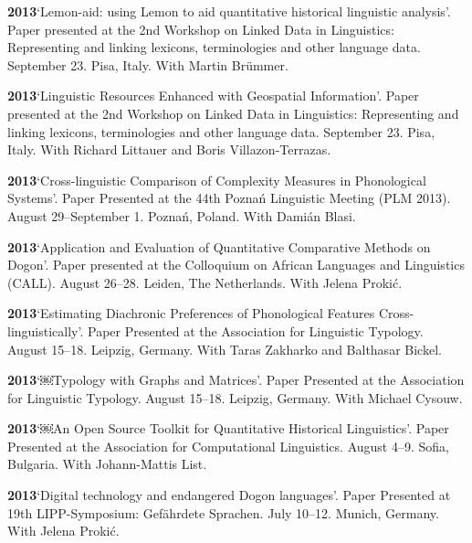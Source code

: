 \documentclass[11pt]{article}
\newcommand{\hangpara}{
 \setlength{\parindent}{0in} %
 \hangindent=0.42in %
}
\begin{document}
\vskip 6pt
\hangpara
{\bf 2013}\hspace{1ex}`Lemon-aid: using Lemon to aid quantitative historical linguistic analysis'. Paper presented at the 2nd Workshop on Linked Data in Linguistics: Representing and linking lexicons, terminologies and other language data. September 23. Pisa, Italy. With Martin Brümmer. 

\vskip 6pt
\hangpara
{\bf 2013}\hspace{1ex}`Linguistic Resources Enhanced with Geospatial Information'. Paper presented at the 2nd Workshop on Linked Data in Linguistics: Representing and linking lexicons, terminologies and other language data. September 23. Pisa, Italy. With Richard Littauer and Boris Villazon-Terrazas.

\vskip 6pt
\hangpara
{\bf 2013}\hspace{1ex}`Cross-linguistic Comparison of Complexity Measures in Phonological Systems'. Paper Presented at the 44th Pozna{\'n} Linguistic Meeting (PLM 2013). August 29--September 1. Pozna{\'n}, Poland. With Dami{\'a}n Blasi.

\vskip 6pt
\hangpara
{\bf 2013}\hspace{1ex}`Application and Evaluation of Quantitative Comparative Methods on Dogon'. Paper presented at the Colloquium on African Languages and Linguistics (CALL). August 26--28. Leiden, The Netherlands. With Jelena Proki{\'c}.

\vskip 6pt
\hangpara
{\bf 2013}\hspace{1ex}`Estimating Diachronic Preferences of Phonological Features Cross-linguistically'. Paper Presented at the Association for Linguistic Typology. August 15--18. Leipzig, Germany. With Taras Zakharko and Balthasar Bickel.

\vskip 6pt
\hangpara
{\bf 2013}\hspace{1ex}`￼Typology with Graphs and Matrices'. Paper Presented at the Association for Linguistic Typology. August 15--18. Leipzig, Germany. With Michael Cysouw.

\vskip 6pt
\hangpara
{\bf 2013}\hspace{1ex}`￼An Open Source Toolkit for Quantitative Historical Linguistics'. Paper Presented at the Association for Computational Linguistics. August 4--9. Sofia, Bulgaria. With Johann-Mattis List.

\vskip 6pt
\hangpara
{\bf 2013}\hspace{1ex}`Digital technology and endangered Dogon languages'. Paper Presented at 19th LIPP-Symposium: Gef{\"a}hrdete Sprachen. July 10--12. Munich, Germany. With Jelena Proki{\'c}.
\end{document}
